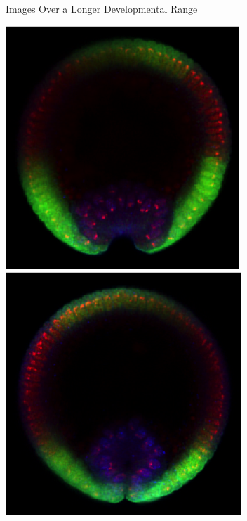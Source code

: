 \documentclass[10pt]{beamer}
\begin{document}
\begin{frame}{Images Over a Longer Developmental Range}
\begin{center}
\hspace{0.2in}
\includegraphics[width=\imwidth]{longtime5}
\hspace{0.2in}
\includegraphics[width=\imwidth]{longtime6}


\end{center}
\end{frame}
\end{document}

